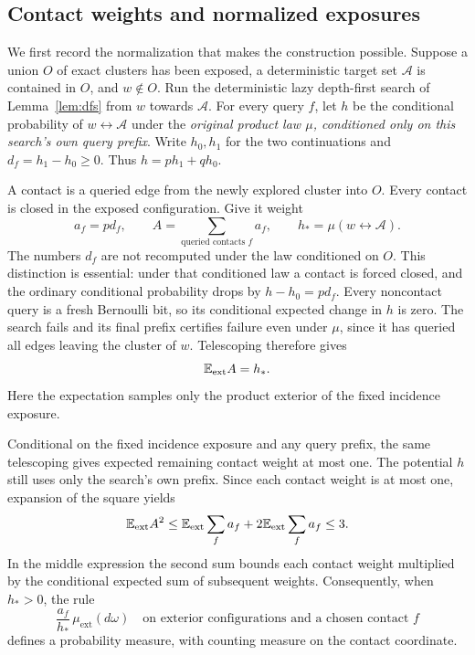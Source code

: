 \subsection{Contact weights and normalized exposures}

We first record the normalization that makes the construction possible.
Suppose a union $O$ of exact clusters has been exposed, a deterministic
target set $\mathcal A$ is contained in $O$, and $w\notin O$.
Run the deterministic lazy depth-first search of Lemma~\ref{lem:dfs}
from $w$ towards $\mathcal A$. For every query $f$, let $h$ be the
conditional probability of $w\leftrightarrow\mathcal A$ under the
\emph{original product law $\mu$, conditioned only on this search's
own query prefix}. Write $h_0,h_1$ for the two continuations and
$d_f=h_1-h_0\ge0$. Thus $h=ph_1+qh_0$.

A contact is a queried edge from the newly explored cluster into $O$.
Every contact is closed in the exposed configuration. Give it weight
\[
 a_f=pd_f,
 \qquad A=\sum_{\text{queried contacts }f}a_f,
 \qquad h_* =\mu(w\leftrightarrow\mathcal A).
\]
The numbers $d_f$ are not recomputed under the law conditioned on $O$.
This distinction is essential: under that conditioned law a contact is
forced closed, and the ordinary conditional probability drops by
$h-h_0=pd_f$. Every noncontact query is a fresh Bernoulli bit, so its
conditional expected change in $h$ is zero. The search fails and its
final prefix certifies failure even under $\mu$, since it has queried
all edges leaving the cluster of $w$. Telescoping therefore gives
\begin{equation}\label{eq:contact-normalization}
 \mathbb E_{\mathrm{ext}}A=h_*.
\end{equation}
Here the expectation samples only the product exterior of the fixed
incidence exposure.

Conditional on the fixed incidence exposure and any query prefix, the
same telescoping gives expected remaining contact weight at most one.
The potential $h$ still uses only the search's own prefix. Since each
contact weight is at most one,
expansion of the square yields
\begin{equation}\label{eq:contact-second-moment}
 \mathbb E_{\mathrm{ext}}A^2
 \le \mathbb E_{\mathrm{ext}}\sum_f a_f
       +2\mathbb E_{\mathrm{ext}}\sum_f a_f
 \le3.
\end{equation}
In the middle expression the second sum bounds each contact weight
multiplied by the conditional expected sum of subsequent weights.
Consequently, when $h_*>0$, the rule
\begin{equation}\label{eq:marked-contact-law}
 \frac{a_f}{h_*}\,\mu_{\mathrm{ext}}(d\omega)
 \quad\text{on exterior configurations and a chosen contact }f
\end{equation}
defines a probability measure, with counting measure on the contact
coordinate.


